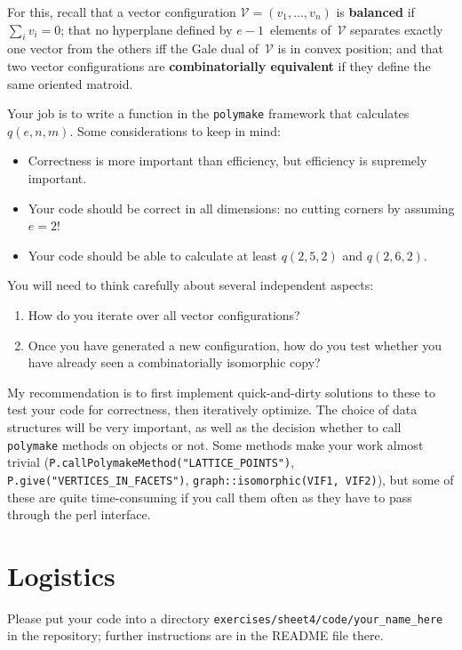 \documentclass[11pt]{amsart}
\newcommand{\VV}{\mathcal{V}}
\newcommand{\defn}[1]{\textbf{\color{blue}#1}} %
\begin{document}
For this, recall 
that a vector configuration $\VV = (v_1,\dots,v_n)$ is \defn{balanced} if $\sum_i v_i=0$;
that no hyperplane defined by $e-1$~elements of~$\VV$ separates   exactly one vector from the others iff the Gale dual of~$\VV$ is in   convex position;
and that two vector configurations are \defn{combinatorially equivalent} if they define the same oriented matroid.

\bigskip
Your job is to write a function in the \texttt{polymake} framework that calculates $q(e,n,m)$. Some considerations to keep in mind:
\begin{itemize}
\item Correctness is more important than efficiency, but efficiency is supremely important.
\item Your code should be correct in all dimensions: no cutting corners by assuming $e=2$!
\item Your code should be able to calculate at least $q(2,5,2)$ and $q(2,6,2)$.
\end{itemize}

You will need to think carefully about several independent aspects:
\begin{enumerate}
\item How do you iterate over all vector configurations?
\item Once you have generated a new configuration, how do you test whether you have already seen a combinatorially isomorphic copy?
\end{enumerate}

My recommendation is to first implement quick-and-dirty solutions to these to test your code for correctness, then iteratively optimize. The choice of data structures will be very important, as well as the decision whether to call \texttt{polymake} methods on objects or not. Some methods make your work almost trivial (\texttt{P.callPolymakeMethod("LATTICE\_POINTS")}, \texttt{P.give("VERTICES\_IN\_FACETS")}, \texttt{graph::isomorphic(VIF1, VIF2)}), but some of these are quite time-consuming if you call them often as they have to pass through the perl interface.

\section*{Logistics}

Please put your code into a directory \texttt{exercises/sheet4/code/your\_name\_here} in the repository; further instructions are in the README file there.
\end{document}

